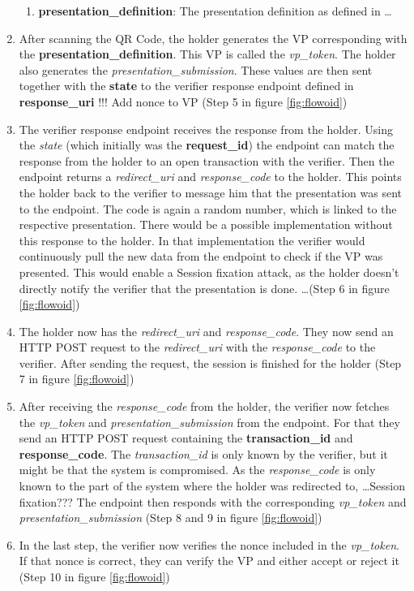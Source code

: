 \documentclass[
	a4paper               %
	,BCOR=0mm            %
	,bibliography=totoc   %
	,listof=totoc         %
	,monolingual
	,twoside=false
]{bfhthesis}              %
\begin{document}
\begin{enumerate}
\begin{enumerate}
		\item \textbf{presentation\_definition}: The presentation definition as defined in \dots
	\end{enumerate}
	\item After scanning the QR Code, the holder generates the VP corresponding with the \textbf{presentation\_definition}. This VP is called the \textit{vp\_token}. The holder also generates the \textit{presentation\_submission}. These values are then sent together with the \textbf{state} to the verifier response endpoint defined in \textbf{response\_uri} !!! Add nonce to VP (Step 5 in figure \ref{fig:flowoid})
	\item The verifier response endpoint receives the response from the holder. Using the \textit{state} (which initially was the \textbf{request\_id}) the endpoint can match the response from the holder to an open transaction with the verifier. Then the endpoint returns a \textit{redirect\_uri} and \textit{response\_code} to the holder. This points the holder back to the verifier to message him that the presentation was sent to the endpoint. The code is again a random number, which is linked to the respective presentation. There would be a possible implementation without this response to the holder. In that implementation the verifier would continuously pull the new data from the endpoint to check if the VP was presented. This would enable a Session fixation attack, as the holder doesn't directly notify the verifier that the presentation is done. \dots (Step 6 in figure \ref{fig:flowoid})
	\item The holder now has the \textit{redirect\_uri} and \textit{response\_code}. They now send an HTTP POST request to the \textit{redirect\_uri} with the \textit{response\_code} to the verifier. After sending the request, the session is finished for the holder (Step 7 in figure \ref{fig:flowoid})
	\item After receiving the \textit{response\_code} from the holder, the verifier now fetches the \textit{vp\_token} and \textit{presentation\_submission} from the endpoint. For that they send an HTTP POST request containing the \textbf{transaction\_id} and \textbf{response\_code}. The \textit{transaction\_id} is only known by the verifier, but it might be that the system is compromised. As the \textit{response\_code} is only known to the part of the system where the holder was redirected to, \dots Session fixation??? The endpoint then responds with the corresponding \textit{vp\_token} and \textit{presentation\_submission} (Step 8 and 9 in figure \ref{fig:flowoid})
	\item In the last step, the verifier now verifies the nonce included in the \textit{vp\_token}. If that nonce is correct, they can verify the VP and either accept or reject it (Step 10 in figure \ref{fig:flowoid})
\end{enumerate}
\end{document}
